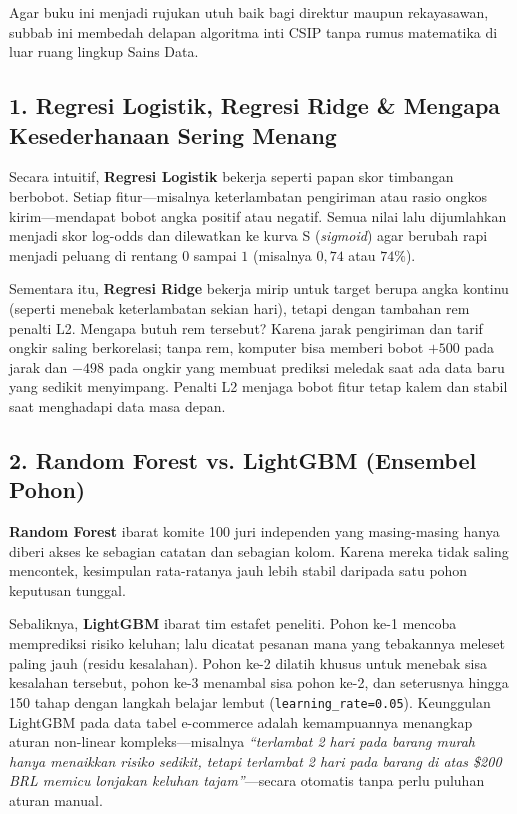 \documentclass[11pt,a4paper,oneside]{book}
\newcommand{\code}[1]{{\small\nolinkurl{#1}}}
\begin{document}
Agar buku ini menjadi rujukan utuh baik bagi direktur maupun rekayasawan, subbab ini membedah delapan algoritma inti CSIP tanpa rumus matematika di luar ruang lingkup Sains Data.

\subsection{1. Regresi Logistik, Regresi Ridge \& Mengapa Kesederhanaan Sering Menang}
Secara intuitif, \textbf{Regresi Logistik} bekerja seperti papan skor timbangan berbobot. Setiap fitur---misalnya keterlambatan pengiriman atau rasio ongkos kirim---mendapat bobot angka positif atau negatif. Semua nilai lalu dijumlahkan menjadi skor log-odds dan dilewatkan ke kurva S (\emph{sigmoid}) agar berubah rapi menjadi peluang di rentang $0$ sampai $1$ (misalnya $0{,}74$ atau $74\%$).

Sementara itu, \textbf{Regresi Ridge} bekerja mirip untuk target berupa angka kontinu (seperti menebak keterlambatan sekian hari), tetapi dengan tambahan rem penalti L2. Mengapa butuh rem tersebut? Karena jarak pengiriman dan tarif ongkir saling berkorelasi; tanpa rem, komputer bisa memberi bobot $+500$ pada jarak dan $-498$ pada ongkir yang membuat prediksi meledak saat ada data baru yang sedikit menyimpang. Penalti L2 menjaga bobot fitur tetap kalem dan stabil saat menghadapi data masa depan.

\subsection{2. Random Forest vs. LightGBM (Ensembel Pohon)}
\textbf{Random Forest} ibarat komite 100 juri independen yang masing-masing hanya diberi akses ke sebagian catatan dan sebagian kolom. Karena mereka tidak saling mencontek, kesimpulan rata-ratanya jauh lebih stabil daripada satu pohon keputusan tunggal.

Sebaliknya, \textbf{LightGBM} ibarat tim estafet peneliti. Pohon ke-1 mencoba memprediksi risiko keluhan; lalu dicatat pesanan mana yang tebakannya meleset paling jauh (residu kesalahan). Pohon ke-2 dilatih khusus untuk menebak sisa kesalahan tersebut, pohon ke-3 menambal sisa pohon ke-2, dan seterusnya hingga 150 tahap dengan langkah belajar lembut (\code{learning_rate=0.05}). Keunggulan LightGBM pada data tabel e-commerce adalah kemampuannya menangkap aturan non-linear kompleks---misalnya \emph{``terlambat 2 hari pada barang murah hanya menaikkan risiko sedikit, tetapi terlambat 2 hari pada barang di atas \$200 BRL memicu lonjakan keluhan tajam''}---secara otomatis tanpa perlu puluhan aturan manual.
\end{document}
